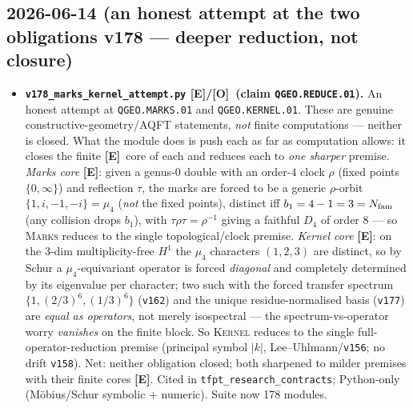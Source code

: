 \documentclass[11pt]{article}
\providecommand{\mE}{\textbf{[E]}}\providecommand{\mC}{\textbf{[C]}}
\providecommand{\mO}{\textbf{[O]}}\providecommand{\mX}{\textbf{[X]}}
\providecommand{\vref}[1]{\texttt{#1}}
\begin{document}
\subsection*{2026-06-14 (an honest attempt at the two obligations v178 --- deeper reduction, not closure)}
\begin{itemize}
\item \textbf{\texttt{v178\_marks\_kernel\_attempt.py} \mE/\mO\ (claim \texttt{QGEO.REDUCE.01}).} An
  honest attempt at \texttt{QGEO.MARKS.01} and \texttt{QGEO.KERNEL.01}. These are genuine
  constructive-geometry/AQFT statements, \emph{not} finite computations --- neither is closed. What
  the module does is push each as far as computation allows: it closes the finite \mE\ core of each
  and reduces each to \emph{one sharper} premise. \emph{Marks core} \mE: given a genus-$0$ double with
  an order-$4$ clock $\rho$ (fixed points $\{0,\infty\}$) and reflection $\tau$, the marks are forced
  to be a generic $\rho$-orbit $\{1,i,-1,-i\}=\mu_4$ (\emph{not} the fixed points), distinct iff
  $b_1=4-1=3=N_{\mathrm{fam}}$ (any collision drops $b_1$), with $\tau\rho\tau=\rho^{-1}$ giving a faithful $D_4$
  of order $8$ --- so \textsc{Marks} reduces to the single topological/clock premise. \emph{Kernel
  core} \mE: on the $3$-dim multiplicity-free $H^1$ the $\mu_4$ characters $(1,2,3)$ are distinct, so
  by Schur a $\mu_4$-equivariant operator is forced \emph{diagonal} and completely determined by its
  eigenvalue per character; two such with the forced transfer spectrum $\{1,(2/3)^6,(1/3)^6\}$
  (\vref{v162}) and the unique residue-normalised basis (\vref{v177}) are \emph{equal as operators},
  not merely isospectral --- the spectrum-vs-operator worry \emph{vanishes} on the finite block. So
  \textsc{Kernel} reduces to the single full-operator-reduction premise (principal symbol $|k|$,
  Lee--Uhlmann/\vref{v156}; no drift \vref{v158}). Net: neither obligation closed; both sharpened to
  milder premises with their finite cores \mE. Cited in \texttt{tfpt\_research\_contracts}; Python-only
  (M\"obius/Schur symbolic $+$ numeric). Suite now 178 modules.
\end{itemize}
\end{document}
